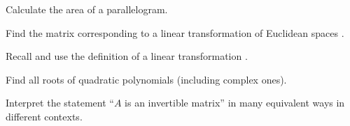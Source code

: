 \begin{readinessAssuranceOutcomes}
\item Calculate the area of a parallelogram.
\item Find the matrix corresponding to a linear transformation of Euclidean spaces .
\item Recall and use the definition of a linear transformation .
\item Find all roots of quadratic polynomials (including complex ones).
\item Interpret the statement ``$A$ is an invertible matrix'' in many equivalent ways in different contexts.
\end{readinessAssuranceOutcomes}
